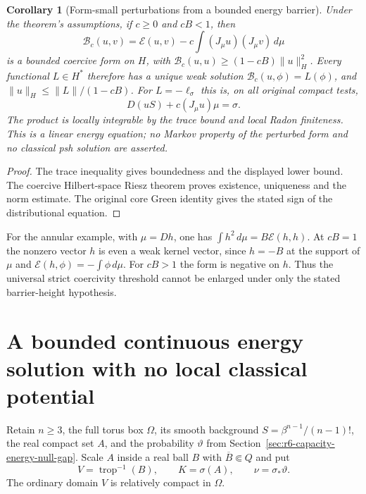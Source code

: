 \documentclass[11pt,a4paper]{article}
\numberwithin{equation}{section}
\newtheorem{corollary}[theorem]{Corollary}
\theoremstyle{definition}
\theoremstyle{remark}
\begin{document}
\begin{corollary}[Form-small perturbations from a bounded energy barrier]
\label{cor:r6-energy-barrier-negative-potential}
Under the theorem's assumptions, if $c\ge0$ and $cB<1$, then
\[
       \mathcal B_c(u,v)=\mathcal E(u,v)
                              -c\int(J_\mu u)(J_\mu v)\,d\mu
\]
is a bounded coercive form on $H$, with
$\mathcal B_c(u,u)\ge(1-cB)\|u\|_H^2$.
Every functional $L\in H^*$ therefore has a unique weak solution
$\mathcal B_c(u,\phi)=L(\phi)$, and
$\|u\|_H\le\|L\|/(1-cB)$.
For $L=-\ell_\sigma$ this is, on all original compact tests,
\[
                         D(uS)+c(J_\mu u)\mu=\sigma.
\]
The product is locally integrable by the trace bound and local Radon
finiteness. This is a linear energy equation; no Markov property of
the perturbed form and no classical psh solution are asserted.
\end{corollary}

\begin{proof}
The trace inequality gives boundedness and the displayed lower
bound. The coercive Hilbert-space Riesz theorem proves existence,
uniqueness and the norm estimate. The original core Green identity
gives the stated sign of the distributional equation.
\end{proof}

For the annular example, with $\mu=Dh$, one has
$\int h^2\,d\mu=B\mathcal E(h,h)$. At $cB=1$ the nonzero vector
$h$ is even a weak kernel vector, since $h=-B$ at the support of
$\mu$ and $\mathcal E(h,\phi)=-\int\phi\,d\mu$. For $cB>1$
the form is negative on $h$. Thus the universal strict coercivity
threshold cannot be enlarged under only the stated barrier-height
hypothesis.



\section{A bounded continuous energy solution with no local classical potential}
\label{sec:r6-energy-data-separation}

Retain $n\ge3$, the full torus box $\Omega$, its smooth background
$S=\beta^{n-1}/(n-1)!$, the real compact set $A$, and the probability
$\vartheta$ from Section~\ref{sec:r6-capacity-energy-null-gap}.
Scale $A$ inside a real ball $B$ with $\overline B\Subset Q$ and put
\[
                 V=\operatorname{trop}^{-1}(B),\qquad
                 K=\sigma(A),\qquad \nu=\sigma_*\vartheta.
\]
The ordinary domain $V$ is relatively compact in $\Omega$.
\end{document}

